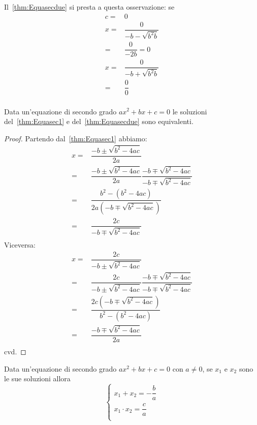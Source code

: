 \begin{commento}
	Il~\vref{thm:Equasecdue} si presta a questa osservazione: se
	\begin{align*}
		c=&0\\
		x=&\dfrac{0}{-b-\sqrt{b^2b}}\\
		=&\dfrac{0}{-2b}=0\\
		x=&\dfrac{0}{-b+\sqrt{b^2b}}\\
		=&\dfrac{0}{0}\\
	\end{align*}
\begin{thm}[Equivalenza]
	Data un'equazione di secondo grado $ax^2+bx+c=0$ le soluzioni 
	del~\vref{thm:Equasec1} e del~\vref{thm:Equasecdue} sono equivalenti.
\end{thm}
\begin{proof}
	Partendo dal~\vref{thm:Equasec1} abbiamo:
	\begin{align*}
	 x=&\dfrac{-b\pm\sqrt{b^2-4ac}}{2a}\\
	=&\dfrac{-b\pm\sqrt{b^2-4ac}}{2a}\dfrac{-b\mp\sqrt{b^2-4ac}}{-b\mp\sqrt{b^2-4ac}}\\
	=&\dfrac{b^2-(b^2-4ac)}{2a(-b\mp\sqrt{b^2-4ac})}\\
	=&\dfrac{2c}{-b\mp\sqrt{b^2-4ac}}\\
	\end{align*}
Viceversa:
\begin{align*}
	x=&\dfrac{2c}{-b\pm\sqrt{b^2-4ac}}\\
	=&\dfrac{2c}{-b\pm\sqrt{b^2-4ac}}\dfrac{-b\mp\sqrt{b^2-4ac}}{-b\mp\sqrt{b^2-4ac}}\\
	=&\dfrac{2c(-b\mp\sqrt{b^2-4ac})}{b^2-(b^2-4ac)}\\
	=&\dfrac{-b\mp\sqrt{b^2-4ac}}{2a}\\
\end{align*}
cvd.
\end{proof}
\end{commento}
\begin{cor}\label{cor:secondogradopropsoluzioni}
Data un'equazione di secondo grado $ax^2+bx+c=0$ con $a\neq 0$, se $x_1$ e $x_2$ sono le sue soluzioni allora\[\begin{cases}
	x_1+x_2=-\dfrac{b}{a}\\
	x_1\cdot x_2=\dfrac{c}{a}\\
\end{cases}\]
\end{cor}
